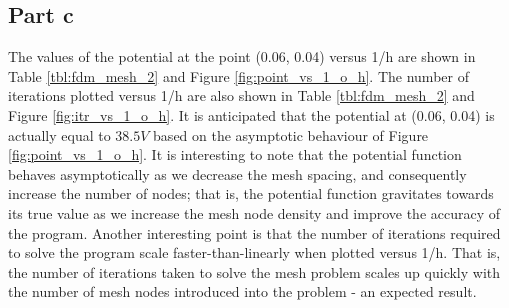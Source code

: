 \documentclass[11pt]{amsart}
\begin{document}
\subsection*{Part c}
The values of the potential at the point (0.06, 0.04) versus 1/h are shown in Table \ref{tbl:fdm_mesh_2} and Figure \ref{fig:point_vs_1_o_h}. The number of iterations plotted versus 1/h are also shown in Table \ref{tbl:fdm_mesh_2} and Figure \ref{fig:itr_vs_1_o_h}. It is anticipated that the potential at (0.06, 0.04) is actually equal to $38.5 V$ based on the asymptotic behaviour of Figure \ref{fig:point_vs_1_o_h}. It is interesting to note that the potential function behaves asymptotically as we decrease the mesh spacing, and consequently increase the number of nodes; that is, the potential function gravitates towards its true value as we increase the mesh node density and improve the accuracy of the program. Another interesting point is that the number of iterations required to solve the program scale faster-than-linearly when plotted versus 1/h. That is, the number of iterations taken to solve the mesh problem scales up quickly with the number of mesh nodes introduced into the problem - an expected result.
\end{document}
